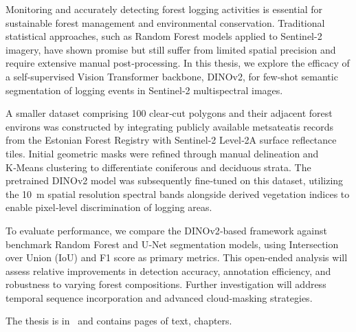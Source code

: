 Monitoring and accurately detecting forest logging activities is essential for sustainable forest management and environmental conservation. Traditional statistical approaches, such as Random Forest models applied to Sentinel-2 imagery, have shown promise but still suffer from limited spatial precision and require extensive manual post‑processing. In this thesis, we explore the efficacy of a self‑supervised Vision Transformer backbone, DINOv2, for few‑shot semantic segmentation of logging events in Sentinel‑2 multispectral images.

A smaller dataset comprising 100 clear‑cut polygons and their adjacent forest environs was constructed by integrating publicly available metsateatis records from the Estonian Forest Registry with Sentinel‑2 Level‑2A surface reflectance tiles. Initial geometric masks were refined through manual delineation and K‑Means clustering to differentiate coniferous and deciduous strata. The pretrained DINOv2 model was subsequently fine‑tuned on this dataset, utilizing the 10 m spatial resolution spectral bands alongside derived vegetation indices to enable pixel‑level discrimination of logging areas.

To evaluate performance, we compare the DINOv2‑based framework against benchmark Random Forest and U‑Net segmentation models, using Intersection over Union (IoU) and F1 score as primary metrics. This open-ended analysis will assess relative improvements in detection accuracy, annotation efficiency, and robustness to varying forest compositions. Further investigation will address temporal sequence incorporation and advanced cloud‑masking strategies.


The thesis is in \langEng~and contains \calculatepages pages of text, 
 chapters.